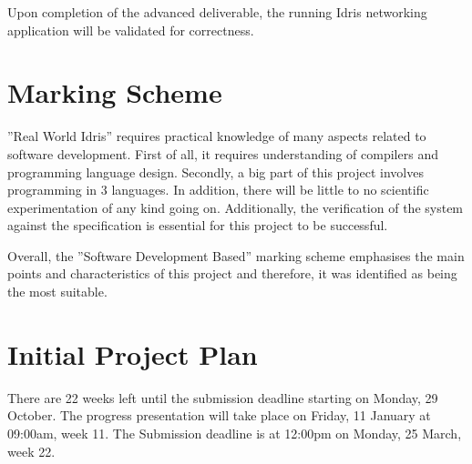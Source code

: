 \documentclass[a4paper]{report}
\begin{document}
Upon completion of the advanced deliverable, the running Idris networking
application will be validated for correctness.



\section{Marking Scheme}
''Real World Idris'' requires practical knowledge of many aspects related to
software development.
First of all, it requires understanding of compilers and programming language
design.
Secondly, a big part of this project involves programming in 3 languages.
In addition, there will be little to no scientific experimentation of any kind
going on.
Additionally, the verification of the system against the specification is
essential for this project to be successful.

Overall, the ''Software Development Based'' marking scheme
emphasises the main points and characteristics of this project and therefore,
it was identified as being the most suitable.




\section{Initial Project Plan}
There are 22 weeks left until the submission deadline starting on Monday,
29 October.
The progress presentation will take place on Friday, 11 January at
09:00am, week 11.
The Submission deadline is at 12:00pm on Monday, 25 March, week 22.
\end{document}
